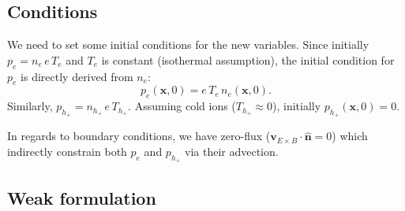 \documentclass[12pt]{article}
\begin{document}
\subsection{Conditions}

We need to set some initial conditions for the new variables. Since initially $p_e = n_e \, e \, T_e$ and $T_e$ is constant (isothermal assumption), the initial condition for $p_e$ is directly derived from $n_e$:
%
\begin{equation}
    p_e(\bm{x}, 0) = e \, T_e \, n_e(\bm{x}, 0).
\end{equation}
%
Similarly, $p_{h_+} = n_{h_+} \, e \, T_{h_+}$. Assuming cold ions ($T_{h_+}\approx 0$), initially $p_{h_+}(\bm{x}, 0) = 0$.

In regards to boundary conditions, we have zero-flux ($\bm{v}_{E \times B} \cdot \hat{\bm{n}} = 0$) which indirectly constrain both $p_e$ and $p_{h_+}$ via their advection.

\subsection{Weak formulation}
\end{document}
